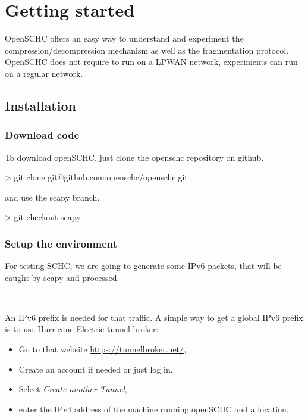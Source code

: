 \chapter{Getting started}

OpenSCHC offers an easy way to understand and experiment the compression/decompression mechanism as well as the fragmentation protocol. OpenSCHC does not require to run on a LPWAN network, experiments can run on a regular network.


\section{Installation}\label{chap-plat}

\subsection{Download code}

To download openSCHC, just clone the openschc repository on github.


\begin{termc}[backgroundcolor=\color{gray!10}, basicstyle=\ttfamily\small, escapechar=@]
> git clone git@github.com:openschc/openschc.git
\end{termc}

and use the scapy branch.

\begin{termc}[backgroundcolor=\color{gray!10}, basicstyle=\ttfamily\small, escapechar=@]
> git checkout scapy
\end{termc}

\subsection{Setup the environment}

For testing SCHC, we are going to generate some IPv6 packets, that will be caught by scapy and processed. 

~

An IPv6 prefix is needed for that traffic. A simple way to get a global IPv6 prefix is to use Hurricane Electric tunnel broker:
\begin{itemize}
\item Go to that website \url{https://tunnelbroker.net/}, 
\item Create an account if needed or just log in, 
\item Select \textit{Create another Tunnel},
\item enter the IPv4 address of the machine running openSCHC and a location,
\end{itemize}

